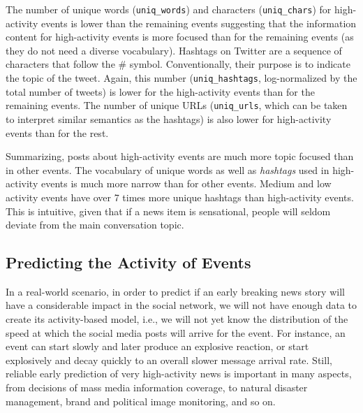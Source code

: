 The number of unique words (\texttt{uniq\_words}) and characters
(\texttt{uniq\_chars}) for high-activity events is lower than the remaining
events suggesting that the information content for high-activity events is more
focused than for the remaining events (as they do not need a diverse
vocabulary). 
%
Hashtags on Twitter are a sequence of characters that follow the \# symbol.
%
Conventionally, their purpose is to indicate the topic of the tweet. 
%
Again, this number (\texttt{uniq\_hashtags}, log-normalized by the total number
of tweets) is lower for the high-activity events than for the remaining events.
%
The number of unique URLs (\texttt{uniq\_urls}, which can be taken to interpret
similar semantics as the hashtags) is also lower for high-activity events than
for the rest. 



Summarizing, posts about high-activity events are much more topic focused than
in other events. 
%
The vocabulary of unique words as well as {\em hashtags} used in high-activity
events is much more narrow than for other events. 
%
Medium and low activity events have over 7 times more unique hashtags than
high-activity events. 
%
This is intuitive, given that if a news item is sensational, people will seldom
deviate from the main conversation topic.


\subsection{Predicting the Activity of Events}

In a real-world scenario, in order to predict if an early breaking news story
will have a considerable impact in the social network, we will not have enough
data to create its activity-based model, i.e., we will not yet know the
distribution of the speed at which the social media posts will arrive for the
event. 
%
For instance, an event can start slowly and later produce an explosive reaction,
or start explosively and decay quickly to an overall slower message arrival
rate. 
%
Still, reliable early prediction of very high-activity news is important in many
aspects, from decisions of mass media information coverage, to natural disaster
management, brand and political image monitoring, and so on.


